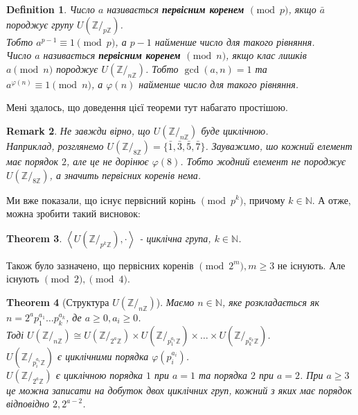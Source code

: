 \documentclass[a4paper, 10pt]{article}
\theoremstyle{theoremdd}
\newtheorem{theorem}{Theorem}[subsection]
\theoremstyle{theoremdd}
\newtheorem{definition}[theorem]{Definition}
\theoremstyle{theoremdd}
\theoremstyle{theoremdd}
\theoremstyle{theoremdd}
\theoremstyle{theoremdd}
\newtheorem{remark}[theorem]{Remark}
\theoremstyle{theoremdd}
\theoremstyle{theoremdd}
\begin{document}
\begin{definition}
Число $a$ називається \textbf{первісним коренем $\pmod p$}, якщо $\bar{a}$ породжує групу $U(\mathbb{Z}/_{p\mathbb{Z}})$.\\
Тобто $a^{p-1} \equiv 1 \pmod p$, а $p-1$ найменше число для такого рівняння.
\bigskip \\
Число $a$ називається \textbf{первісним коренем $\pmod n$}, якщо клас лишків $a \pmod n$ породжує $U(\mathbb{Z}/_{n\mathbb{Z}})$. Тобто $\gcd(a,n) =1$ та $a^{\varphi(n)} \equiv 1 \pmod n$, а $\varphi(n)$ найменше число для такого рівняння.
\end{definition}

Мені здалось, що доведення цієї теореми тут набагато простішою.

\begin{remark}
Не завжди вірно, що $U(\mathbb{Z}/_{n \mathbb{Z}})$ буде циклічною.\\
Наприклад, розглянемо $U(\mathbb{Z}/_{8 \mathbb{Z}}) = \{ \bar{1}, \bar{3}, \bar{5}, \bar{7} \}$. Зауважимо, шо кожний елемент має порядок $2$, але це не дорінює $\varphi(8)$. Тобто жодний елемент не породжує $U(\mathbb{Z}/_{8 \mathbb{Z}})$, а значить первісних коренів нема.
\end{remark}

Ми вже показали, що існує первісний корінь $\pmod {p^k}$, причому $k \in \mathbb{N}$. А отже, можна зробити такий висновок:
\begin{theorem}
$\left< U(\mathbb{Z}/_{p^k \mathbb{Z}}), \cdot \right>$ - циклічна група, $k \in \mathbb{N}$.
\end{theorem}

Також було зазначено, що первісних коренів $\pmod {2^m}, m \geq 3$ не існують. Але існують $\pmod 2, \pmod 4$.

\begin{theorem}[Структура $U(\mathbb{Z}/_{n \mathbb{Z}})$]
Маємо $n \in \mathbb{N}$, яке розкладається як $n = 2^a p_1^{a_1} \dots p_k^{a_k}$, де $a \geq 0, a_i \geq 0$. \\
Тоді $U(\mathbb{Z}/_{n \mathbb{Z}}) \cong U(\mathbb{Z}/_{2^a \mathbb{Z}}) \times U(\mathbb{Z}/_{p_1^{a_1} \mathbb{Z}}) \times \dots \times U(\mathbb{Z}/_{p_k^{a_k} \mathbb{Z}})$.\\
$U(\mathbb{Z}/_{p_i^{a_i} \mathbb{Z}})$ є циклічними порядка $\varphi(p_i^{a_i})$.\\
$U(\mathbb{Z}/_{2^a \mathbb{Z}})$ є циклічною порядка $1$ при $a=1$ та порядка $2$ при $a=2$. При $a \geq 3$ це можна записати на добуток двох циклічних груп, кожний з яких має порядок відповідно $2, 2^{a-2}$.
\end{theorem}
\end{document}
